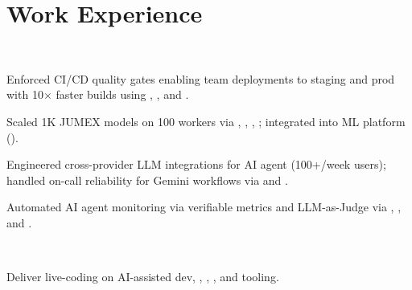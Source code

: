 \documentclass{tex/deedy-resume-openfont}
\begin{document}
\hfill
\begin{minipage}[t]{0.67\textwidth} 


\section{Work Experience}
\\
\vspace{\topsep}
\begin{tightemize}
    \item Enforced CI/CD quality gates enabling team deployments to staging and prod with 10$\times$ faster builds using , , and .
    \item Scaled 1K JUMEX models on 100  workers via , , , ; integrated into ML platform ().
    \item Engineered cross-provider LLM integrations for AI agent (100+/week users); handled on-call reliability for Gemini workflows via  and .
    \item Automated AI agent monitoring via verifiable metrics and LLM-as-Judge via , , and .
\end{tightemize}
\sectionsep

\\
\begin{tightemize}
    \item Deliver live-coding on AI-assisted dev, , , , and tooling.
\end{tightemize}
\sectionsep


\end{minipage}
\end{document}

